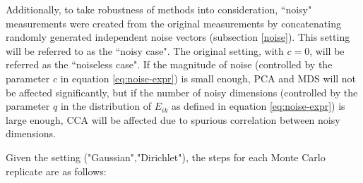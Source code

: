 \documentclass[11pt]{article} %
\begin{document}
 Additionally, to take robustness of methods into consideration, ``noisy" measurements were created from the original measurements by concatenating randomly generated independent noise vectors (subsection \ref{noise}).   This setting will be referred to as the ``noisy case". The original setting, with $c=0$,  will be referred as the ``noiseless case".
If the magnitude of noise (controlled by the parameter $c$ in equation \eqref{eq:noise-expr}) is small enough, PCA and MDS will not be affected significantly, but if the number of noisy dimensions (controlled by the parameter $q$ in the distribution of $E_{ik}$ as defined in equation \eqref{eq:noise-expr}) is large enough, CCA  will be affected due to spurious correlation between noisy dimensions.

Given the setting ("Gaussian","Dirichlet"),   the steps for each Monte Carlo replicate are as follows:
\end{document}

